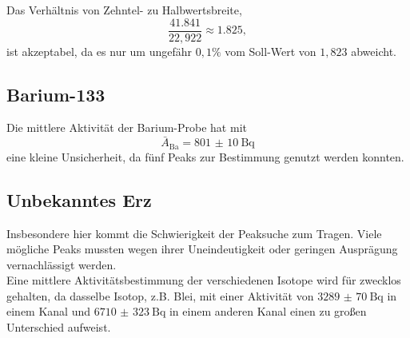 Das Verhältnis von Zehntel- zu Halbwertsbreite,
\begin{equation}
    \frac{41.841}{22,922} \approx 1.825,
\end{equation}
ist akzeptabel, da es nur um ungefähr $0,1 \%$ vom Soll-Wert von $1,823$ abweicht.

\subsection{Barium-133}

Die mittlere Aktivität der Barium-Probe hat mit
\begin{equation}
    \bar{A}_\text{Ba} = \qty{801(10)}{\becquerel}
\end{equation}
eine kleine Unsicherheit, da fünf Peaks zur Bestimmung genutzt werden konnten.\\

\subsection{Unbekanntes Erz}

Insbesondere hier kommt die Schwierigkeit der Peaksuche zum Tragen. Viele mögliche Peaks mussten
wegen ihrer Uneindeutigkeit oder geringen Ausprägung vernachlässigt werden.\\

Eine mittlere Aktivitätsbestimmung der verschiedenen Isotope wird für zwecklos gehalten, da dasselbe Isotop, z.B. Blei, mit 
einer Aktivität von $\qty{3289(70)}{\becquerel}$ in einem Kanal und $\qty{6710(323)}{\becquerel}$ in einem anderen Kanal einen zu großen Unterschied aufweist.\\


